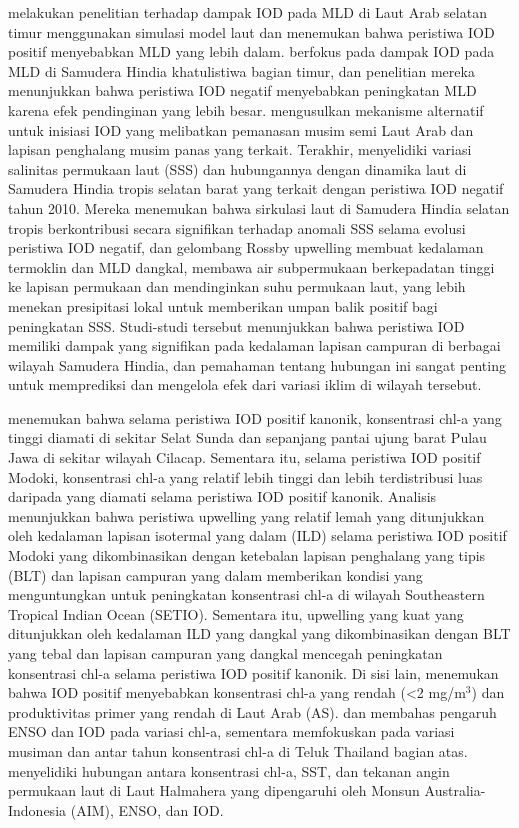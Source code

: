\begin{spacing}{1.5}
	 melakukan penelitian terhadap dampak IOD pada MLD di Laut Arab selatan timur menggunakan simulasi model laut dan menemukan bahwa peristiwa IOD positif menyebabkan MLD yang lebih dalam.  berfokus pada dampak IOD pada MLD di Samudera Hindia khatulistiwa bagian timur, dan penelitian mereka menunjukkan bahwa peristiwa IOD negatif menyebabkan peningkatan MLD karena efek pendinginan yang lebih besar.  mengusulkan mekanisme alternatif untuk inisiasi IOD yang melibatkan pemanasan musim semi Laut Arab dan lapisan penghalang musim panas yang terkait. Terakhir,  menyelidiki variasi salinitas permukaan laut (SSS) dan hubungannya dengan dinamika laut di Samudera Hindia tropis selatan barat yang terkait dengan peristiwa IOD negatif tahun 2010. Mereka menemukan bahwa sirkulasi laut di Samudera Hindia selatan tropis berkontribusi secara signifikan terhadap anomali SSS selama evolusi peristiwa IOD negatif, dan gelombang Rossby upwelling membuat kedalaman termoklin dan MLD dangkal, membawa air subpermukaan berkepadatan tinggi ke lapisan permukaan dan mendinginkan suhu permukaan laut, yang lebih menekan presipitasi lokal untuk memberikan umpan balik positif bagi peningkatan SSS. Studi-studi tersebut menunjukkan bahwa peristiwa IOD memiliki dampak yang signifikan pada kedalaman lapisan campuran di berbagai wilayah Samudera Hindia, dan pemahaman tentang hubungan ini sangat penting untuk memprediksi dan mengelola efek dari variasi iklim di wilayah tersebut.
	
	 menemukan bahwa selama peristiwa IOD positif kanonik, konsentrasi chl-a yang tinggi diamati di sekitar Selat Sunda dan sepanjang pantai ujung barat Pulau Jawa di sekitar wilayah Cilacap. Sementara itu, selama peristiwa IOD positif Modoki, konsentrasi chl-a yang relatif lebih tinggi dan lebih terdistribusi luas daripada yang diamati selama peristiwa IOD positif kanonik. Analisis menunjukkan bahwa peristiwa upwelling yang relatif lemah yang ditunjukkan oleh kedalaman lapisan isotermal yang dalam (ILD) selama peristiwa IOD positif Modoki yang dikombinasikan dengan ketebalan lapisan penghalang yang tipis (BLT) dan lapisan campuran yang dalam memberikan kondisi yang menguntungkan untuk peningkatan konsentrasi chl-a di wilayah Southeastern Tropical Indian Ocean (SETIO). Sementara itu, upwelling yang kuat yang ditunjukkan oleh kedalaman ILD yang dangkal yang dikombinasikan dengan BLT yang tebal dan lapisan campuran yang dangkal mencegah peningkatan konsentrasi chl-a selama peristiwa IOD positif kanonik. Di sisi lain,  menemukan bahwa IOD positif menyebabkan konsentrasi chl-a yang rendah (<2 mg/m$^3$) dan produktivitas primer yang rendah di Laut Arab (AS).  dan  membahas pengaruh ENSO dan IOD pada variasi chl-a, sementara  memfokuskan pada variasi musiman dan antar tahun konsentrasi chl-a di Teluk Thailand bagian atas.  menyelidiki hubungan antara konsentrasi chl-a, SST, dan tekanan angin permukaan laut di Laut Halmahera yang dipengaruhi oleh Monsun Australia-Indonesia (AIM), ENSO, dan IOD.
	
	
\end{spacing}
\vspace{-1pc}
